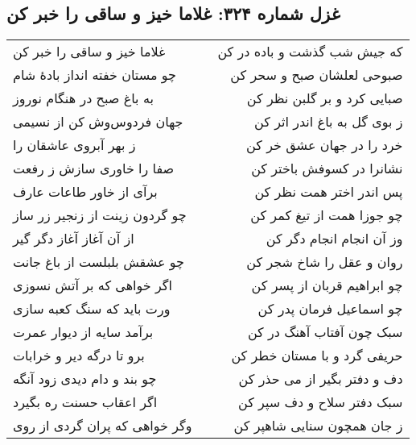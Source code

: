 \begin{center}
\section*{غزل شماره ۳۲۴: غلاما خیز و ساقی را خبر کن}
\label{sec:324}
\begin{longtable}{l p{0.5cm} r}
غلاما خیز و ساقی را خبر کن
&&
که جیش شب گذشت و باده در کن
\\
چو مستان خفته انداز بادهٔ شام
&&
صبوحی لعلشان صبح و سحر کن
\\
به باغ صبح در هنگام نوروز
&&
صبایی کرد و بر گلبن نظر کن
\\
جهان فردوس‌وش کن از نسیمی
&&
ز بوی گل به باغ اندر اثر کن
\\
ز بهر آبروی عاشقان را
&&
خرد را در جهان عشق خر کن
\\
صفا را خاوری سازش ز رفعت
&&
نشانرا در کسوفش باختر کن
\\
برآی از خاور طاعات عارف
&&
پس اندر اختر همت نظر کن
\\
چو گردون زینت از زنجیر زر ساز
&&
چو جوزا همت از تیغ کمر کن
\\
از آن آغاز آغاز دگر گیر
&&
وز آن انجام انجام دگر کن
\\
چو عشقش بلبلست از باغ جانت
&&
روان و عقل را شاخ شجر کن
\\
اگر خواهی که بر آتش نسوزی
&&
چو ابراهیم قربان از پسر کن
\\
ورت باید که سنگ کعبه سازی
&&
چو اسماعیل فرمان پدر کن
\\
برآمد سایه از دیوار عمرت
&&
سبک چون آفتاب آهنگ در کن
\\
برو تا درگه دیر و خرابات
&&
حریفی گرد و با مستان خطر کن
\\
چو بند و دام دیدی زود آنگه
&&
دف و دفتر بگیر از می حذر کن
\\
اگر اعقاب حسنت ره بگیرد
&&
سبک دفتر سلاح و دف سپر کن
\\
وگر خواهی که پران گردی از روی
&&
ز جان همچون سنایی شاهپر کن
\\
\end{longtable}
\end{center}
